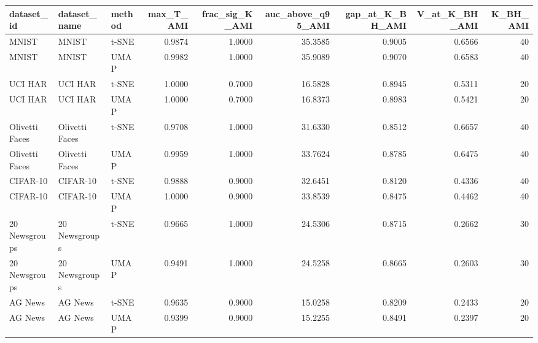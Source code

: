 \begin{tabular}{lllrrrrrr}
\toprule
dataset_id & dataset_name & method & max_T_AMI & frac_sig_K_AMI & auc_above_q95_AMI & gap_at_K_BH_AMI & V_at_K_BH_AMI & K_BH_AMI \\
\midrule
MNIST & MNIST & t-SNE & 0.9874 & 1.0000 & 35.3585 & 0.9005 & 0.6566 & 40 \\
MNIST & MNIST & UMAP & 0.9982 & 1.0000 & 35.9089 & 0.9070 & 0.6583 & 40 \\
UCI HAR & UCI HAR & t-SNE & 1.0000 & 0.7000 & 16.5828 & 0.8945 & 0.5311 & 20 \\
UCI HAR & UCI HAR & UMAP & 1.0000 & 0.7000 & 16.8373 & 0.8983 & 0.5421 & 20 \\
Olivetti Faces & Olivetti Faces & t-SNE & 0.9708 & 1.0000 & 31.6330 & 0.8512 & 0.6657 & 40 \\
Olivetti Faces & Olivetti Faces & UMAP & 0.9959 & 1.0000 & 33.7624 & 0.8785 & 0.6475 & 40 \\
CIFAR-10 & CIFAR-10 & t-SNE & 0.9888 & 0.9000 & 32.6451 & 0.8120 & 0.4336 & 40 \\
CIFAR-10 & CIFAR-10 & UMAP & 1.0000 & 0.9000 & 33.8539 & 0.8475 & 0.4462 & 40 \\
20 Newsgroups & 20 Newsgroups & t-SNE & 0.9665 & 1.0000 & 24.5306 & 0.8715 & 0.2662 & 30 \\
20 Newsgroups & 20 Newsgroups & UMAP & 0.9491 & 1.0000 & 24.5258 & 0.8665 & 0.2603 & 30 \\
AG News & AG News & t-SNE & 0.9635 & 0.9000 & 15.0258 & 0.8209 & 0.2433 & 20 \\
AG News & AG News & UMAP & 0.9399 & 0.9000 & 15.2255 & 0.8491 & 0.2397 & 20 \\
\bottomrule
\end{tabular}

